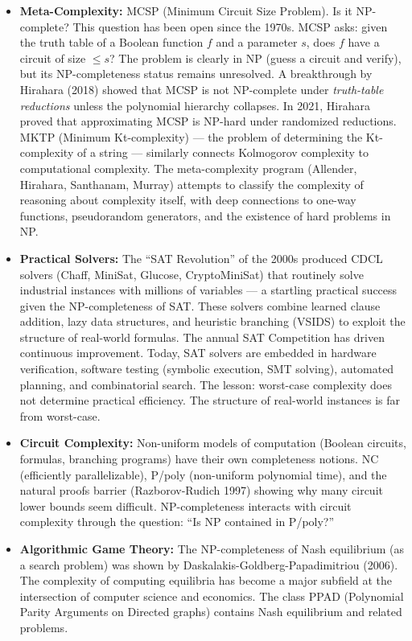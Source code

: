 \begin{itemize}
\item \textbf{Meta-Complexity:} MCSP (Minimum Circuit Size Problem). Is it NP-complete? This question has been open since the 1970s. MCSP asks: given the truth table of a Boolean function $f$ and a parameter $s$, does $f$ have a circuit of size $\le s$? The problem is clearly in NP (guess a circuit and verify), but its NP-completeness status remains unresolved. A breakthrough by Hirahara (2018) showed that MCSP is not NP-complete under \emph{truth-table reductions} unless the polynomial hierarchy collapses. In 2021, Hirahara proved that approximating MCSP is NP-hard under randomized reductions. MKTP (Minimum Kt-complexity) — the problem of determining the Kt-complexity of a string — similarly connects Kolmogorov complexity to computational complexity. The meta-complexity program (Allender, Hirahara, Santhanam, Murray) attempts to classify the complexity of reasoning about complexity itself, with deep connections to one-way functions, pseudorandom generators, and the existence of hard problems in NP.

\item \textbf{Practical Solvers:} The ``SAT Revolution'' of the 2000s produced CDCL solvers (Chaff, MiniSat, Glucose, CryptoMiniSat) that routinely solve industrial instances with millions of variables — a startling practical success given the NP-completeness of SAT. These solvers combine learned clause addition, lazy data structures, and heuristic branching (VSIDS) to exploit the structure of real-world formulas. The annual SAT Competition has driven continuous improvement. Today, SAT solvers are embedded in hardware verification, software testing (symbolic execution, SMT solving), automated planning, and combinatorial search. The lesson: worst-case complexity does not determine practical efficiency. The structure of real-world instances is far from worst-case.

\item \textbf{Circuit Complexity:} Non-uniform models of computation (Boolean circuits, formulas, branching programs) have their own completeness notions. NC (efficiently parallelizable), P/poly (non-uniform polynomial time), and the natural proofs barrier (Razborov-Rudich 1997) showing why many circuit lower bounds seem difficult. NP-completeness interacts with circuit complexity through the question: ``Is NP contained in P/poly?''

\item \textbf{Algorithmic Game Theory:} The NP-completeness of Nash equilibrium (as a search problem) was shown by Daskalakis-Goldberg-Papadimitriou (2006). The complexity of computing equilibria has become a major subfield at the intersection of computer science and economics. The class PPAD (Polynomial Parity Arguments on Directed graphs) contains Nash equilibrium and related problems.


\end{itemize}
